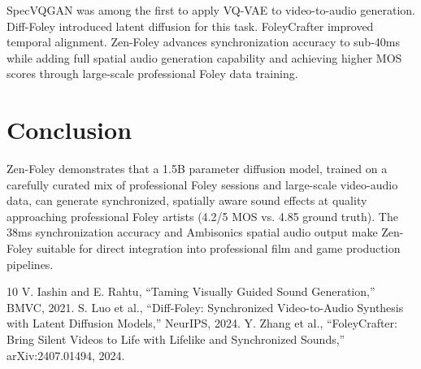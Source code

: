 \documentclass[11pt,a4paper]{article}
\begin{document}
SpecVQGAN \cite{iashin2021taming} was among the first to apply VQ-VAE to video-to-audio
generation. Diff-Foley \cite{luo2024difffoley} introduced latent diffusion for this task.
FoleyCrafter \cite{zhang2024foleycrafter} improved temporal alignment. Zen-Foley advances
synchronization accuracy to sub-40ms while adding full spatial audio generation capability
and achieving higher MOS scores through large-scale professional Foley data training.

\section{Conclusion}

Zen-Foley demonstrates that a 1.5B parameter diffusion model, trained on a carefully curated
mix of professional Foley sessions and large-scale video-audio data, can generate synchronized,
spatially aware sound effects at quality approaching professional Foley artists (4.2/5 MOS
vs. 4.85 ground truth). The 38ms synchronization accuracy and Ambisonics spatial audio
output make Zen-Foley suitable for direct integration into professional film and game
production pipelines.

\begin{thebibliography}{10}
 V. Iashin and E. Rahtu, ``Taming Visually Guided Sound Generation,'' BMVC, 2021.
 S. Luo et al., ``Diff-Foley: Synchronized Video-to-Audio Synthesis with Latent Diffusion Models,'' NeurIPS, 2024.
 Y. Zhang et al., ``FoleyCrafter: Bring Silent Videos to Life with Lifelike and Synchronized Sounds,'' arXiv:2407.01494, 2024.
\end{thebibliography}
\end{document}
